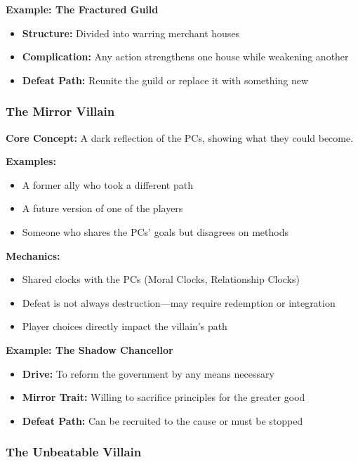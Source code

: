 \textbf{Example: The Fractured Guild}
\begin{itemize}
  \item \textbf{Structure:} Divided into warring merchant houses
  \item \textbf{Complication:} Any action strengthens one house while weakening another
  \item \textbf{Defeat Path:} Reunite the guild or replace it with something new
\end{itemize}

\subsubsection{The Mirror Villain}

\textbf{Core Concept:} A dark reflection of the PCs, showing what they could become.

\textbf{Examples:}
\begin{itemize}
  \item A former ally who took a different path
  \item A future version of one of the players
  \item Someone who shares the PCs' goals but disagrees on methods
\end{itemize}

\textbf{Mechanics:}
\begin{itemize}
  \item Shared clocks with the PCs (Moral Clocks, Relationship Clocks)
  \item Defeat is not always destruction---may require redemption or integration
  \item Player choices directly impact the villain's path
\end{itemize}

\textbf{Example: The Shadow Chancellor}
\begin{itemize}
  \item \textbf{Drive:} To reform the government by any means necessary
  \item \textbf{Mirror Trait:} Willing to sacrifice principles for the greater good
  \item \textbf{Defeat Path:} Can be recruited to the cause or must be stopped
\end{itemize}

\subsubsection{The Unbeatable Villain}

